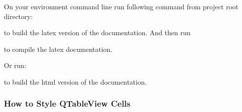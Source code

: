 \documentclass[letterpaper,10pt,english]{sphinxmanual}
\begin{document}
On your environment command line run following command from project root directory:

\begin{sphinxVerbatim}[commandchars=\\\{\}]
     \PYGZbs{} \PYGZbs{}\PYGZbs{}
\end{sphinxVerbatim}

to build the latex version of the documentation. And then run

\begin{sphinxVerbatim}[commandchars=\\\{\}]
 \PYGZbs{}\PYGZbs{}  
\end{sphinxVerbatim}

to compile the latex documentation.

Or run:

\begin{sphinxVerbatim}[commandchars=\\\{\}]
     \PYGZbs{} \PYGZbs{}\PYGZbs{}
\end{sphinxVerbatim}

to build the html version of the documentation.


\subsubsection{How to Style QTableView Cells}
\label{\detokenize{howto:how-to-style-qtableview-cells}}


\renewcommand{\indexname}{Python Module Index}
\begin{sphinxtheindex}
\let\bigletter\sphinxstyleindexlettergroup
\bigletter{b}
\item\relax{}
\item\relax{}
\item\relax{}
\end{sphinxtheindex}

\renewcommand{\indexname}{Index}
\printindex
\end{document}
